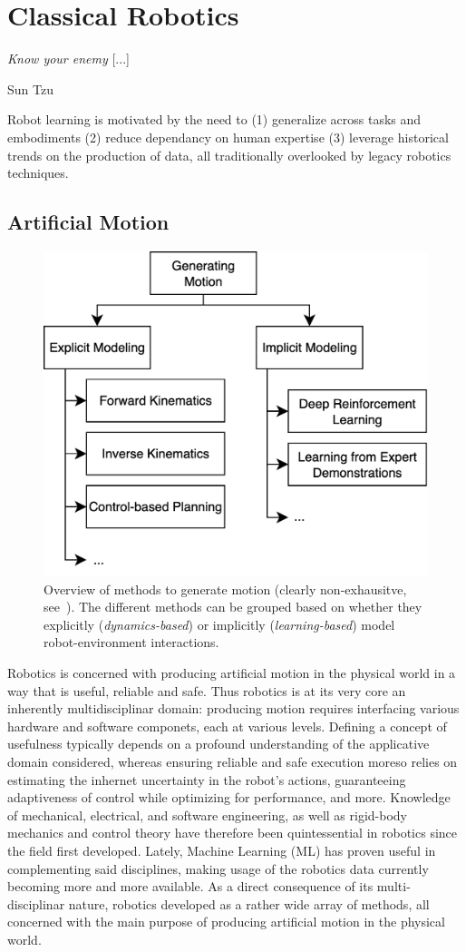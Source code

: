 \section{Classical Robotics}

\epigraph{\textit{Know your enemy} [...]}{Sun Tzu}

\begin{tldr}
Robot learning is motivated by the need to (1) generalize across tasks and embodiments (2) reduce dependancy on human expertise (3) leverage historical trends on the production of data, all traditionally overlooked by legacy robotics techniques.
\end{tldr}

\subsection{Artificial Motion}
\label{sec:classical}

\begin{figure}
    \centering
    \includegraphics[width=0.5\linewidth]{figures/ch2/ch2-approaches.png}
    \caption{Overview of methods to generate motion (clearly non-exhausitve, see~\citet{bekrisStateRobotMotion2024}). The different methods can be grouped based on whether they explicitly (\emph{dynamics-based}) or implicitly (\emph{learning-based}) model robot-environment interactions.}
    \label{fig:generating-motion-atlas}
\end{figure}

Robotics is concerned with producing artificial motion in the physical world in a way that is useful, reliable and safe.
Thus robotics is at its very core an inherently multidisciplinar domain: producing motion requires interfacing various hardware and software componets, each at various levels.
Defining a concept of usefulness typically depends on a profound understanding of the applicative domain considered, whereas ensuring reliable and safe execution moreso relies on estimating the inhernet uncertainty in the robot's actions, guaranteeing adaptiveness of control while optimizing for performance, and more.
Knowledge of mechanical, electrical, and software engineering, as well as rigid-body mechanics and control theory have therefore been quintessential in robotics since the field first developed.
Lately, Machine Learning (ML) has proven useful in complementing said disciplines, making usage of the robotics data currently becoming more and more available.
As a direct consequence of its multi-disciplinar nature, robotics developed as a rather wide array of methods, all concerned with the main purpose of producing artificial motion in the physical world.

